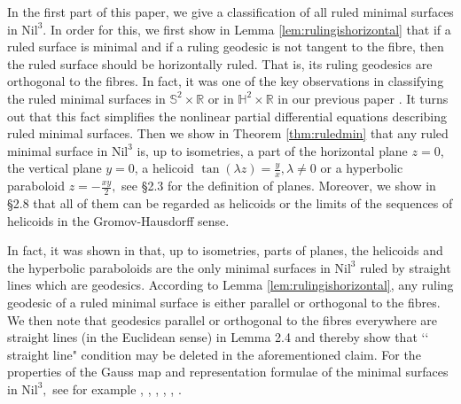 \documentclass[11pt]{amsart}
\begin{document}
In the first part of this paper, we give a classification of all
ruled minimal surfaces in $\text{Nil}^3.$ In order for this, we
first show in Lemma \ref{lem:rulingishorizontal} that if a ruled
surface is minimal and if a ruling geodesic is not tangent to the
fibre, then the ruled surface should be horizontally ruled. That
is, its ruling geodesics are orthogonal to the fibres. In fact, it
was one of the key observations in classifying the ruled minimal
surfaces in ${\mathbb S}^2\times{\mathbb R}$ or in ${\mathbb
H}^2\times{\mathbb R}$ in our previous paper \cite{KKSY}. It turns
out that this fact simplifies the nonlinear partial differential
equations describing ruled minimal surfaces. Then we show in
Theorem \ref{thm:ruledmin} that any ruled minimal surface in
$\text{Nil}^3$ is, up to isometries, a part of the horizontal
plane $z=0$, the vertical plane $y=0$, a helicoid $\tan(\lambda
z)=\frac{y}{x}, \lambda\ne0$ or a hyperbolic paraboloid
$z=-\frac{xy}2,$ see \S 2.3 for the definition of planes.
Moreover, we show in \S 2.8 that all of them can be regarded as
helicoids or the limits of the sequences of helicoids in the
Gromov-Hausdorff sense.

In fact, it was shown in \cite{BS} that, up to isometries,
parts of planes, the helicoids 
and the
hyperbolic paraboloids
are the only minimal
surfaces in $\text{Nil}^3$ ruled by straight lines which are
geodesics. According to Lemma \ref{lem:rulingishorizontal}, any
ruling geodesic of a ruled minimal surface is either parallel or
orthogonal to the fibres. We then note that geodesics parallel or
orthogonal to the fibres everywhere are straight lines (in the
Euclidean sense) in Lemma 2.4 and thereby show that \lq\lq
straight line" condition may be deleted in the aforementioned
claim.
For the properties of the Gauss map and representation formulae of
the minimal surfaces in $\text{Nil}^3,$ see for example
\cite{BBBI}, \cite{D}, \cite{I1}, \cite{I2}, \cite{MMP}, \cite{S}.
\end{document}
